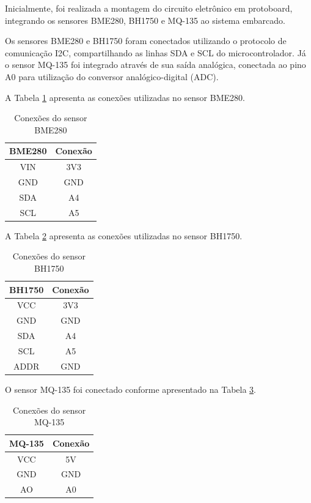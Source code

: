 \documentclass[a4paper,12pt]{article}
\begin{document}
Inicialmente, foi realizada a montagem do circuito eletrônico em protoboard, integrando os sensores BME280, BH1750 e MQ-135 ao sistema embarcado.

Os sensores BME280 e BH1750 foram conectados utilizando o protocolo de comunicação I2C, compartilhando as linhas SDA e SCL do microcontrolador. Já o sensor MQ-135 foi integrado através de sua saída analógica, conectada ao pino A0 para utilização do conversor analógico-digital (ADC).

A Tabela \ref{tab:bme280} apresenta as conexões utilizadas no sensor BME280.

\begin{table}[H]
\centering
\caption{Conexões do sensor BME280}
\label{tab:bme280}
\begin{tabular}{|c|c|}
\hline
\textbf{BME280} & \textbf{Conexão} \\ \hline
VIN & 3V3 \\ \hline
GND & GND \\ \hline
SDA & A4 \\ \hline
SCL & A5 \\ \hline
\end{tabular}
\end{table}

A Tabela \ref{tab:bh1750} apresenta as conexões utilizadas no sensor BH1750.

\begin{table}[H]
\centering
\caption{Conexões do sensor BH1750}
\label{tab:bh1750}
\begin{tabular}{|c|c|}
\hline
\textbf{BH1750} & \textbf{Conexão} \\ \hline
VCC & 3V3 \\ \hline
GND & GND \\ \hline
SDA & A4 \\ \hline
SCL & A5 \\ \hline
ADDR & GND \\ \hline
\end{tabular}
\end{table}

O sensor MQ-135 foi conectado conforme apresentado na Tabela \ref{tab:mq135}.

\begin{table}[H]
\centering
\caption{Conexões do sensor MQ-135}
\label{tab:mq135}
\begin{tabular}{|c|c|}
\hline
\textbf{MQ-135} & \textbf{Conexão} \\ \hline
VCC & 5V \\ \hline
GND & GND \\ \hline
AO & A0 \\ \hline
\end{tabular}
\end{table}
\end{document}
